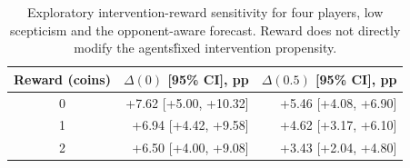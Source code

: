 \begin{table}[htbp]\centering\scriptsize
\caption{Exploratory intervention-reward sensitivity for four players, low scepticism and the opponent-aware forecast. Reward does not directly modify the agents\' fixed intervention propensity.}
\label{tab:s4}
\begin{tabular}{crr}\toprule
Reward (coins) & $\Delta(0)$ [95\% CI], pp & $\Delta(0.5)$ [95\% CI], pp \\ \midrule
0 & +7.62 [+5.00, +10.32] & +5.46 [+4.08, +6.90] \\
1 & +6.94 [+4.42, +9.58] & +4.62 [+3.17, +6.10] \\
2 & +6.50 [+4.00, +9.08] & +3.43 [+2.04, +4.80] \\
\bottomrule\end{tabular}\end{table}
